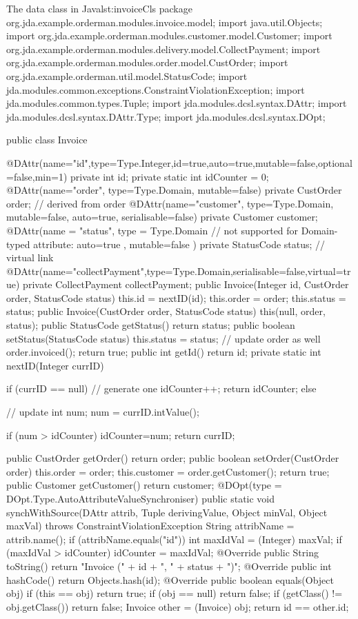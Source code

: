 \begin{lstcodeplainssm}{The data class  in Java}{lst:invoiceCls}
package org.jda.example.orderman.modules.invoice.model;
import java.util.Objects;
import org.jda.example.orderman.modules.customer.model.Customer;
import org.jda.example.orderman.modules.delivery.model.CollectPayment;
import org.jda.example.orderman.modules.order.model.CustOrder;
import org.jda.example.orderman.util.model.StatusCode;
import jda.modules.common.exceptions.ConstraintViolationException;
import jda.modules.common.types.Tuple;
import jda.modules.dcsl.syntax.DAttr;
import jda.modules.dcsl.syntax.DAttr.Type;
import jda.modules.dcsl.syntax.DOpt;

public class Invoice {
	@DAttr(name="id",type=Type.Integer,id=true,auto=true,mutable=false,optional=false,min=1)
	private int id;	
	private static int idCounter = 0;
	@DAttr(name="order", type=Type.Domain, mutable=false)
	private CustOrder order;
	// derived from order
	@DAttr(name="customer", type=Type.Domain, mutable=false, auto=true, serialisable=false)
	private Customer customer;
	@DAttr(name = "status", type = Type.Domain
	// not supported for Domain-typed attribute: auto=true
	, mutable=false
	)
	private StatusCode status;
	//  virtual link
	@DAttr(name="collectPayment",type=Type.Domain,serialisable=false,virtual=true)
	private CollectPayment collectPayment;
	public Invoice(Integer id, CustOrder order, StatusCode status) {
		this.id = nextID(id);
		this.order = order;
		this.status = status;
	}
	public Invoice(CustOrder order, StatusCode status) {
		this(null, order, status);
	}
	public StatusCode getStatus() {
		return status;
	}
	public boolean setStatus(StatusCode status) {
		this.status = status;	
		// update order as well
		order.invoiced();		
		return true;
	}	
	public int getId() {
		return id;
	}	
	private static int nextID(Integer currID) {
		if (currID == null) { // generate one
			idCounter++;
			return idCounter;
		} else { // update
			int num;
			num = currID.intValue();
			
			if (num > idCounter) {
				idCounter=num;
			}   
			return currID;
		}
	}
	public CustOrder getOrder() {
		return order;
	}
	public boolean setOrder(CustOrder order) {
		this.order = order;
		this.customer = order.getCustomer();
		return true;
	}
	public Customer getCustomer() {
		return customer;
	}	
	@DOpt(type = DOpt.Type.AutoAttributeValueSynchroniser)
	public static void synchWithSource(DAttr attrib, Tuple derivingValue, Object minVal, Object maxVal) throws ConstraintViolationException {
		String attribName = attrib.name();
		if (attribName.equals("id")) {
			int maxIdVal = (Integer) maxVal;
			if (maxIdVal > idCounter)
			idCounter = maxIdVal;
		}
	}	
	@Override
	public String toString() {
		return "Invoice (" + id + ", " + status + ")";
	}	
	@Override
	public int hashCode() {
		return Objects.hash(id);
	}
	@Override
	public boolean equals(Object obj) {
		if (this == obj)
		return true;
		if (obj == null)
		return false;
		if (getClass() != obj.getClass())
		return false;
		Invoice other = (Invoice) obj;
		return id == other.id;
	}	
}
\end{lstcodeplainssm}
